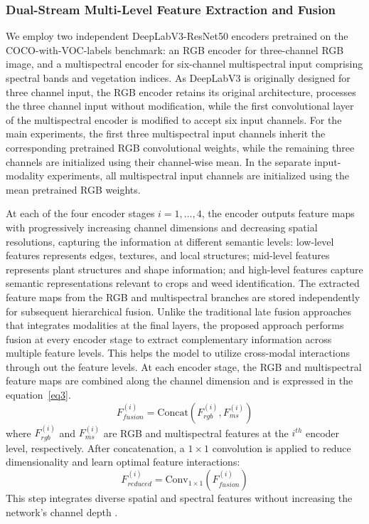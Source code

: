 \documentclass[pdflatex,sn-mathphys-num]{sn-jnl}
\newcommand{\rev}[1]{{\color{revisionblue}#1}}
\newenvironment{revblock}{\color{revisionblue}}{}
\begin{document}
\begin{revblock}
\subsubsection{Dual-Stream Multi-Level Feature Extraction and Fusion}
We employ two independent DeepLabV3-ResNet50 encoders pretrained on the COCO-with-VOC-labels benchmark: an RGB encoder for three-channel RGB image, and a multispectral encoder for six-channel multispectral input comprising spectral bands and vegetation indices. As DeepLabV3 is originally designed for three channel input, the RGB encoder retains its original architecture, processes the three channel input without modification, while the first convolutional layer of the multispectral encoder is modified to accept six input channels. \rev{For the main experiments, the first three
multispectral input channels inherit the
corresponding pretrained RGB convolutional
weights, while the remaining three channels
are initialized using their channel-wise mean.
In the separate input-modality experiments,
all multispectral input channels are initialized
using the mean pretrained RGB weights.}

At each of the four encoder stages $i=1,\dots,4$, the encoder outputs feature maps with progressively increasing channel dimensions and decreasing spatial resolutions, capturing the information at different semantic levels: low-level features represents edges, textures, and local structures; mid-level features represents plant structures and shape information; and high-level features capture semantic representations relevant to crops and weed identification. The extracted feature maps from the RGB and multispectral branches are stored independently for subsequent hierarchical fusion. Unlike the traditional late fusion approaches that integrates modalities at the final layers, the proposed approach performs fusion at every encoder stage to extract complementary information across multiple feature levels. This helps the model to utilize cross-modal interactions through out the feature levels. At each encoder stage, the RGB and multispectral feature maps are combined along the channel dimension and is expressed in the equation~\ref{eq3}. 
\begin{equation}
F_{fusion}^{(i)} = \text{Concat}(F_{rgb}^{(i)}, F_{ms}^{(i)})\label{eq3}
\end{equation}
where $F_{rgb}^{(i)}$ and $F_{ms}^{(i)}$ are RGB and multispectral features at the $i^{th}$ encoder level, respectively. After concatenation, a $1\times1$ convolution is applied to reduce dimensionality and learn optimal feature interactions:
\begin{equation}
F_{reduced}^{(i)} = \text{Conv}_{1\times1}(F_{fusion}^{(i)})
\end{equation}
This step integrates diverse spatial and spectral features without increasing the network's channel depth \cite{lin2017fpn}.
\end{revblock}
\end{document}
